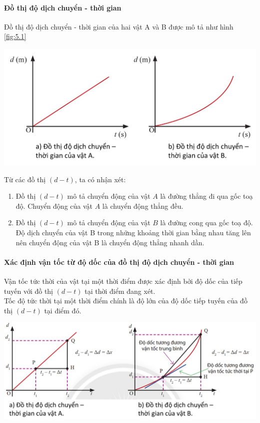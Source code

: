 \begin{tomtat}
	\paragraph{Đồ thị độ dịch chuyển - thời gian}
	Đồ thị độ dịch chuyển - thời gian của hai vật A và B được mô tả như hình \ref{fig:5.1}
	\begin{center}
		\includegraphics[scale=0.5]{figs/G10Y25B3-18}
		\label{fig:5.1}
	\end{center}
	Từ các đồ thị $\left(d-t\right)$, ta có nhận xét:
	\begin{enumerate}[label=\alph*)]
		\item Đồ thị $\left(d-t\right)$ mô tả chuyển động của vật $A$ là đường thẳng đi qua gốc toạ độ. Chuyển động của vật $A$ là chuyển động thẳng đều.
		\item Đồ thị $\left(d-t\right)$ mô tả chuyển động của vật $B$ là đường cong qua gốc toạ độ. Độ dịch chuyển của vật B trong những khoảng thời gian bằng nhau tăng lên nên chuyển động của vật B là chuyển động thẳng nhanh dần.
	\end{enumerate}
	\paragraph{Xác định vận tốc từ độ dốc của đồ thị độ dịch chuyển - thời gian}
	\begin{tc}
		Vận tốc tức thời của vật tại một thời điểm được xác định bởi độ dốc của tiếp tuyến với đồ thị $\left(d-t\right)$ tại thời điểm đang xét.\\
		Tốc độ tức thời tại một thời điểm chính là độ lớn của độ dốc tiếp tuyến của đồ thị $\left(d-t\right)$ tại điểm đó.
	\end{tc}
	\begin{center}
		\includegraphics[scale=0.5]{figs/G10Y25B3-19}
		\label{fig:5.2}
	\end{center}
	
\end{tomtat}

